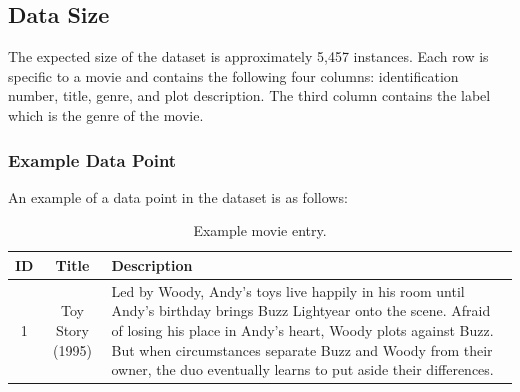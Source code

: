 \subsection{Data Size}
The expected size of the dataset is approximately 5,457 instances. 
Each row is specific to a movie and contains the following four columns: identification number, title, genre, and plot description. 
The third column contains the label which is the genre of the movie.

\subsubsection{Example Data Point}
An example of a data point in the dataset is as follows:
\begin{table}[h]
\centering
\begin{tabular}{|c|c|p{3.5cm}|}
\hline
\textbf{ID} & \textbf{Title} & \textbf{Description} \\
\hline
1 & Toy Story (1995) & Led by Woody, Andy's toys live happily in his room until Andy's birthday brings Buzz Lightyear onto the scene. Afraid of losing his place in Andy's heart, Woody plots against Buzz. But when circumstances separate Buzz and Woody from their owner, the duo eventually learns to put aside their differences. \\
\hline
\end{tabular}
\caption{Example movie entry.}
\end{table}